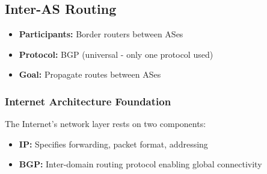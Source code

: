 \documentclass[../../compsys.tex]{subfiles}
\begin{document}
\subsection{Inter-AS Routing}
\begin{itemize}
    \item \textbf{Participants:} Border routers between ASes
    \item \textbf{Protocol:} BGP (universal - only one protocol used)
    \item \textbf{Goal:} Propagate routes between ASes
\end{itemize}


\subsubsection{Internet Architecture Foundation}
The Internet's network layer rests on two components:
\begin{itemize}
    \item \textbf{IP:} Specifies forwarding, packet format, addressing
    \item \textbf{BGP:} Inter-domain routing protocol enabling global connectivity
\end{itemize}
\end{document}
